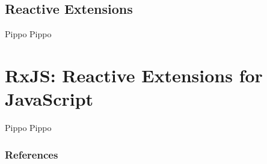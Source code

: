         \subsection{Reactive Extensions}\label{subsec:rx}
        \begin{frame}{\insertsectionhead}{\insertsubsectionhead}
            \begin{block}{Pippo}
                Pippo
            \end{block}
        \end{frame}

    \section{RxJS: Reactive Extensions for JavaScript}\label{sec:rxjs}
        \begin{frame}{\insertsectionhead}{\insertsubsectionhead}
            \begin{block}{Pippo}
                Pippo
            \end{block}
        \end{frame}
    \nocite{*}
    \begin{frame}[t,allowframebreaks]
        \frametitle{References}
        \printbibliography[heading=bibintoc]
    \end{frame}

